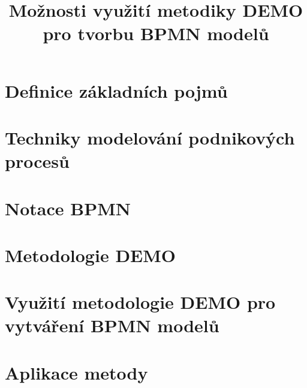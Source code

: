 \documentclass[thesis=M,czech]{FITthesis}[2012/06/26]
\title{Možnosti využití metodiky DEMO pro tvorbu BPMN modelů}
\begin{document}

\begin{introduction}
	
\end{introduction}

\chapter{Definice základních pojmů} \label{chap:1}
	

\chapter{Techniky modelování podnikových procesů} \label{chap:2}
	

\chapter{Notace BPMN} \label{chap:3}
	
	
\chapter{Metodologie DEMO} \label{chap:4}
	
	
\chapter{Využití metodologie DEMO pro vytváření BPMN modelů} \label{chap:5}
	

\chapter{Aplikace metody} \label{chap:6}
	
	
\begin{conclusion}
	
\end{conclusion}

\nocite{*}



\appendix
\end{document}
